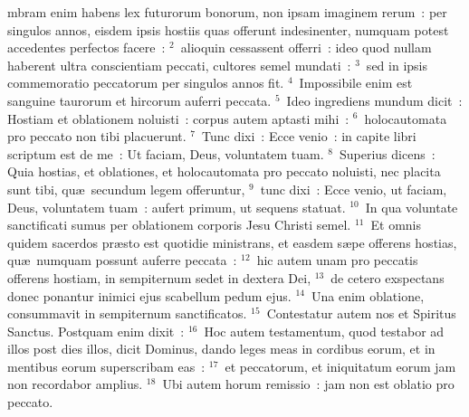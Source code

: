 \bchapter
{}mbram enim habens lex futurorum bonorum, non ipsam imaginem rerum~: per singulos annos, eisdem ipsis hostiis quas offerunt indesinenter, numquam potest accedentes perfectos facere~:
${}^{2}$~alioquin cessassent offerri~: ideo quod nullam haberent ultra conscientiam peccati, cultores semel mundati~:
${}^{3}$~sed in ipsis commemoratio peccatorum per singulos annos fit.
${}^{4}$~Impossibile enim est sanguine taurorum et hircorum auferri peccata.
${}^{5}$~Ideo ingrediens mundum dicit~: Hostiam et oblationem noluisti~: corpus autem aptasti mihi~:
${}^{6}$~holocautomata pro peccato non tibi placuerunt.
${}^{7}$~Tunc dixi~: Ecce venio~: in capite libri scriptum est de me~: Ut faciam, Deus, voluntatem tuam.
${}^{8}$~Superius dicens~: Quia hostias, et oblationes, et holocautomata pro peccato noluisti, nec placita sunt tibi, qu\ae\ secundum legem offeruntur,
${}^{9}$~tunc dixi~: Ecce venio, ut faciam, Deus, voluntatem tuam~: aufert primum, ut sequens statuat.
${}^{10}$~In qua voluntate sanctificati sumus per oblationem corporis Jesu Christi semel.
${}^{11}$~Et omnis quidem sacerdos pr\ae sto est quotidie ministrans, et easdem s\ae pe offerens hostias, qu\ae\ numquam possunt auferre peccata~:
${}^{12}$~hic autem unam pro peccatis offerens hostiam, in sempiternum sedet in dextera Dei,
${}^{13}$~de cetero exspectans donec ponantur inimici ejus scabellum pedum ejus.
${}^{14}$~Una enim oblatione, consummavit in sempiternum sanctificatos.
${}^{15}$~Contestatur autem nos et Spiritus Sanctus. Postquam enim dixit~:
${}^{16}$~Hoc autem testamentum, quod testabor ad illos post dies illos, dicit Dominus, dando leges meas in cordibus eorum, et in mentibus eorum superscribam eas~:
${}^{17}$~et peccatorum, et iniquitatum eorum jam non recordabor amplius.
${}^{18}$~Ubi autem horum remissio~: jam non est oblatio pro peccato.


